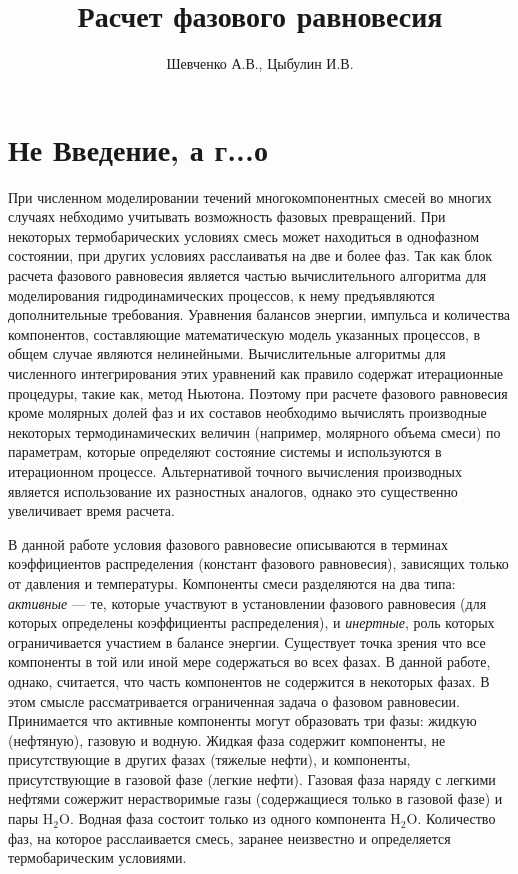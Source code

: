 \documentclass[12pt]{article}
\title{Расчет фазового равновесия}
\author{Шевченко А.В., Цыбулин И.В.}
\begin{document}
\maketitle

\section{Не Введение, а г...о}

При численном моделировании течений многокомпонентных смесей во многих случаях небходимо учитывать возможность фазовых превращений. При некоторых термобарических условиях смесь может находиться в однофазном состоянии, при других условиях расслаиватья на две и более фаз. Так как блок расчета фазового равновесия является частью вычислительного алгоритма для моделирования гидродинамических процессов, к нему предъявляются дополнительные требования. Уравнения балансов энергии, импульса и количества компонентов, составляющие математическую модель указанных процессов, в общем случае являются нелинейными. Вычислительные алгоритмы для численного интегрирования этих уравнений как правило содержат итерационные процедуры, такие как, метод Ньютона. Поэтому при расчете фазового равновесия кроме молярных долей фаз и их составов необходимо вычислять производные некоторых термодинамических величин (например, молярного объема смеси) по параметрам, которые определяют состояние системы и используются в итерационном процессе. Альтернативой точного вычисления производных является использование их разностных аналогов, однако это существенно увеличивает время расчета.

В данной работе условия фазового равновесие описываются в терминах коэффициентов распределения (констант фазового равновесия), зависящих только от давления и температуры. Компоненты смеси разделяются на два типа: \emph{активные} --- те, которые участвуют в установлении фазового равновесия (для которых определены коэффициенты распределения), и \emph{инертные}, роль которых ограничивается участием в балансе энергии. Существует точка зрения что все компоненты в той или иной мере содержаться во всех фазах. В данной работе, однако, считается, что часть компонентов не содержится в некоторых фазах. В этом смысле рассматривается ограниченная задача о фазовом равновесии. Принимается что активные компоненты могут образовать три фазы: жидкую (нефтяную), газовую и водную.  Жидкая фаза содержит компоненты, не присутствующие в других фазах (тяжелые нефти), и компоненты, присутствующие в газовой фазе (легкие нефти). Газовая фаза наряду с легкими нефтями сожержит нерастворимые газы (содержащиеся только в газовой фазе) и пары $\mathrm{H_2O}$. Водная фаза состоит только из одного компонента $\mathrm{H_2O}$. Количество фаз, на которое расслаивается смесь, заранее неизвестно и определяется термобарическим условиями.
\end{document}
